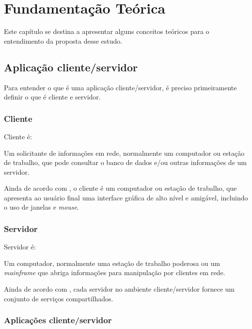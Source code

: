 \chapter{Fundamentação Teórica}\label{cap:fundamentacao-teorica}

Este capítulo se destina a apresentar alguns conceitos teóricos para o 
entendimento da proposta desse estudo.

\section{Aplicação cliente/servidor}

Para entender o que é uma aplicação cliente/servidor, é preciso primeiramente 
definir o que é cliente e servidor.

\subsection{Cliente}
Cliente é:

\begin{citacao}
Um solicitante de informações em rede, normalmente um computador ou estação de 
trabalho, que pode consultar o banco de dados e/ou outras informações de um 
servidor. \cite{stallings2005}
\end{citacao}

Ainda de acordo com , o cliente é um computador ou 
estação de trabalho, que apresenta ao usuário final uma interface gráfica de 
alto nível e amigável, incluindo o uso de janelas e \textit{mouse}. 

\subsection{Servidor}

Servidor é:

\begin{citacao}
	
Um computador, normalmente uma estação de trabalho poderosa ou um 
\textit{mainframe} que abriga informações para manipulação por clientes em 
rede. \cite{stallings2005}

\end{citacao}

Ainda de acordo com , cada servidor no ambiente 
cliente/servidor fornece um conjunto de serviços compartilhados.

\subsection{Aplicações cliente/servidor}

